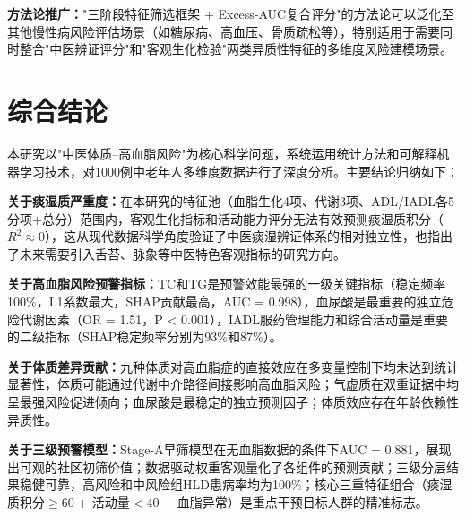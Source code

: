 \documentclass[12pt,a4paper]{ctexart}
\begin{document}
\textbf{方法论推广：}"三阶段特征筛选框架 + Excess-AUC复合评分"的方法论可以泛化至其他慢性病风险评估场景（如糖尿病、高血压、骨质疏松等），特别适用于需要同时整合"中医辨证评分"和"客观生化检验"两类异质性特征的多维度风险建模场景。

\section{综合结论}

本研究以"中医体质--高血脂风险"为核心科学问题，系统运用统计方法和可解释机器学习技术，对1000例中老年人多维度数据进行了深度分析。主要结论归纳如下：

\textbf{关于痰湿质严重度：}在本研究的特征池（血脂生化4项、代谢3项、ADL/IADL各5分项+总分）范围内，客观生化指标和活动能力评分无法有效预测痰湿质积分（$R^2 \approx 0$），这从现代数据科学角度验证了中医痰湿辨证体系的相对独立性，也指出了未来需要引入舌苔、脉象等中医特色客观指标的研究方向。

\textbf{关于高血脂风险预警指标：}TC和TG是预警效能最强的一级关键指标（稳定频率100\%，L1系数最大，SHAP贡献最高，AUC = 0.998），血尿酸是最重要的独立危险代谢因素（OR = 1.51，P < 0.001），IADL服药管理能力和综合活动量是重要的二级指标（SHAP稳定频率分别为93\%和87\%）。

\textbf{关于体质差异贡献：}九种体质对高血脂症的直接效应在多变量控制下均未达到统计显著性，体质可能通过代谢中介路径间接影响高血脂风险；气虚质在双重证据中均呈最强风险促进倾向；血尿酸是最稳定的独立预测因子；体质效应存在年龄依赖性异质性。

\textbf{关于三级预警模型：}Stage-A早筛模型在无血脂数据的条件下AUC = 0.881，展现出可观的社区初筛价值；数据驱动权重客观量化了各组件的预测贡献；三级分层结果稳健可靠，高风险和中风险组HLD患病率均为100\%；核心三重特征组合（痰湿质积分$\geq 60$ + 活动量$< 40$ + 血脂异常）是重点干预目标人群的精准标志。
\end{document}
